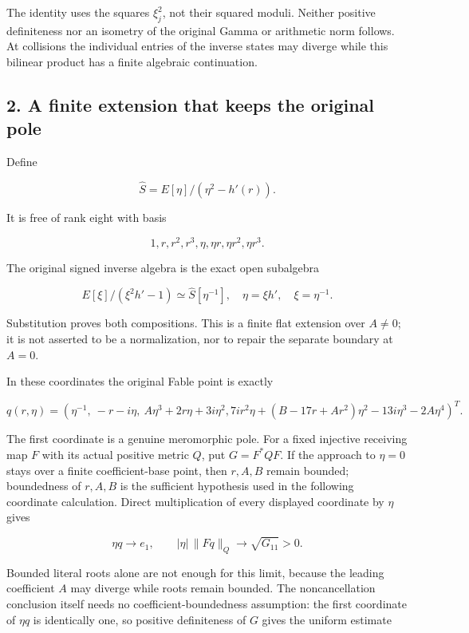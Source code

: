 The identity uses the squares \(\xi_j^2\), not their squared moduli.
Neither positive definiteness nor an isometry of the original Gamma or
arithmetic norm follows. At collisions the individual entries of the
inverse states may diverge while this bilinear product has a finite
algebraic continuation.

\subsection{2. A finite extension that keeps the original
pole}\label{a-finite-extension-that-keeps-the-original-pole}

Define

\[
 \widehat S=E[\eta]/(\eta^2-h'(r)).
\]

It is free of rank eight with basis

\[
 1,r,r^2,r^3,\eta,\eta r,\eta r^2,\eta r^3.
\]

The original signed inverse algebra is the exact open subalgebra

\[
 E[\xi]/(\xi^2h'-1)\simeq\widehat S[\eta^{-1}],
 \quad\eta=\xi h',\quad\xi=\eta^{-1}.
\]

Substitution proves both compositions. This is a finite flat extension
over \(A\ne0\); it is not asserted to be a normalization, nor to repair
the separate boundary at \(A=0\).

In these coordinates the original Fable point is exactly

\[
 q(r,\eta)=\left(
 \eta^{-1},\ -r-i\eta,\ A\eta^3+2r\eta+3i\eta^2,
 7ir^2\eta+(B-17r+Ar^2)\eta^2-13i\eta^3-2A\eta^4
 \right)^T.
\]

The first coordinate is a genuine meromorphic pole. For a fixed
injective receiving map \(F\) with its actual positive metric \(Q\), put
\(G=F^*QF\). If the approach to \(\eta=0\) stays over a finite
coefficient-base point, then \(r,A,B\) remain bounded; boundedness of
\(r,A,B\) is the sufficient hypothesis used in the following coordinate
calculation. Direct multiplication of every displayed coordinate by
\(\eta\) gives

\[
 \eta q\longrightarrow e_1,\qquad
 \boxed{|\eta|\,\|Fq\|_Q\longrightarrow\sqrt{G_{11}}>0.}
\]

Bounded literal roots alone are not enough for this limit, because the
leading coefficient \(A\) may diverge while roots remain bounded. The
noncancellation conclusion itself needs no coefficient-boundedness
assumption: the first coordinate of \(\eta q\) is identically one, so
positive definiteness of \(G\) gives the uniform estimate


